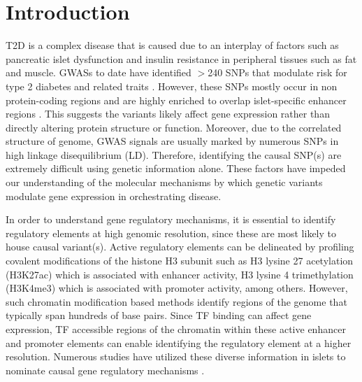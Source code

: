 ﻿\section{Introduction}
T2D is a complex disease that is caused due to an interplay of factors such as pancreatic islet dysfunction and insulin resistance in peripheral tissues such as fat and muscle. GWASs to date have identified $>$240 SNPs that modulate risk for type 2 diabetes and related traits \cite{mahajanFinemappingTypeDiabetes2018}. However, these SNPs mostly occur in non protein-coding regions and are highly enriched to overlap islet-specific enhancer regions \cite{theencodeprojectconsortiumIntegratedEncyclopediaDNA2012, mauranoSystematicLocalizationCommon2012, trynkaChromatinMarksIdentify2013, parkerChromatinStretchEnhancer2013, pasqualiPancreaticIsletEnhancer2014, quangMotifSignaturesStretch2015}. This suggests the variants likely affect gene expression rather than directly altering protein structure or function. Moreover, due to the correlated structure of genome, GWAS signals are usually marked by numerous SNPs in high linkage disequilibrium (LD). Therefore, identifying the causal SNP(s) are extremely difficult using genetic information alone. These factors have impeded our understanding of the molecular mechanisms by which genetic variants modulate gene expression in orchestrating disease. 


In order to understand gene regulatory mechanisms, it is essential to identify regulatory elements at high genomic resolution, since these are most likely to house causal variant(s). Active regulatory elements can be delineated by profiling covalent modifications of the histone H3 subunit such as H3 lysine 27 acetylation (H3K27ac) which is associated with enhancer activity, H3 lysine 4 trimethylation (H3K4me3) which is associated with promoter activity, among others. However, such chromatin modification based methods identify regions of the genome that typically span hundreds of base pairs. Since TF binding can affect gene expression, TF accessible regions of the chromatin within these active enhancer and promoter elements can enable identifying the regulatory element at a higher resolution. Numerous studies have utilized these diverse information in islets to nominate causal gene regulatory mechanisms \cite{varshneyGeneticRegulatorySignatures2017,buntTranscriptExpressionData2015, fadistaGlobalGenomicTranscriptomic2014, thurnerIntegrationHumanPancreatic2018, romanTypeDiabetesAssociated2017, thurnerIntegrationHumanPancreatic2018}. 


